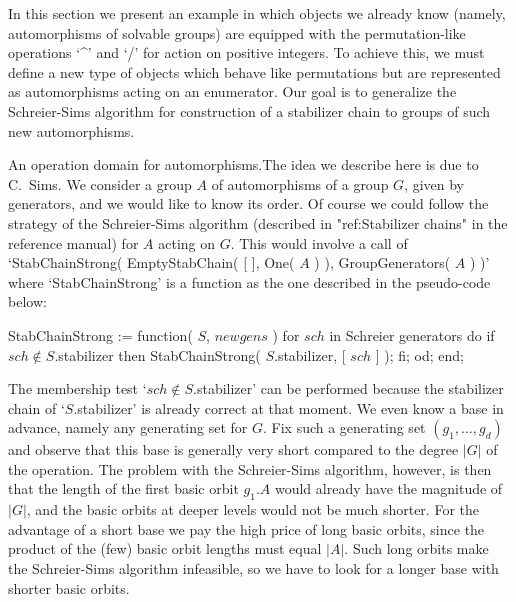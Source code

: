 In this section  we present an example in  which objects we  already know
(namely,  automorphisms  of   solvable  groups)   are  equipped  with the
permutation-like operations `^' and `/'  for action on positive integers.
To achieve this, we must  define a new  type of objects which behave like
permutations   but are  represented     as automorphisms  acting  on   an
enumerator.  Our  goal is to  generalize  the Schreier-Sims algorithm for
construction of a stabilizer chain to groups of such new automorphisms.

{\bsf  An operation domain for automorphisms.}\quad  The idea we describe
here is due  to C.~Sims. We consider  a group $A$  of  automorphisms of a
group $G$, given by generators,  and we would like  to know its order. Of
course we  could   follow the strategy  of  the   Schreier-Sims algorithm
(described  in "ref:Stabilizer chains"  in  the reference manual) for $A$
acting   on   $G$. This would    involve   a  call  of  `StabChainStrong(
EmptyStabChain( [   ],  One( $A$ ) ),   GroupGenerators(  $A$ ) )'  where
`StabChainStrong'  is a function as the  one described in the pseudo-code
below:

StabChainStrong := function( $S$, $newgens$ )
\quad for $sch$  in {\rm Schreier generators}  do
\qquad if $sch \notin S$.stabilizer  then
\qquad\quad StabChainStrong( $S$.stabilizer, [ $sch$ ] );
\qquad fi;
\quad od;
end;

The membership test `$sch  \notin S$.stabilizer' can be performed because
the  stabilizer chain  of `$S$.stabilizer'  is   already correct at  that
moment. We  even know a base  in advance, namely  any  generating set for
$G$. Fix such  a generating set  $(g_1,\ldots,g_d)$ and observe that this
base  is  generally very   short compared  to   the degree $|G|$  of  the
operation. The problem with the Schreier-Sims algorithm, however, is then
that the length of the first  basic orbit $g_1.A$  would already have the
magnitude of $|G|$,  and the basic orbits at  deeper levels would  not be
much shorter. For the advantage of a short base  we pay the high price of
long basic  orbits, since the  product of  the  (few) basic orbit lengths
must  equal $|A|$.  Such  long  orbits  make the Schreier-Sims  algorithm
infeasible,   so we have to   look for a  longer base  with shorter basic
orbits.

